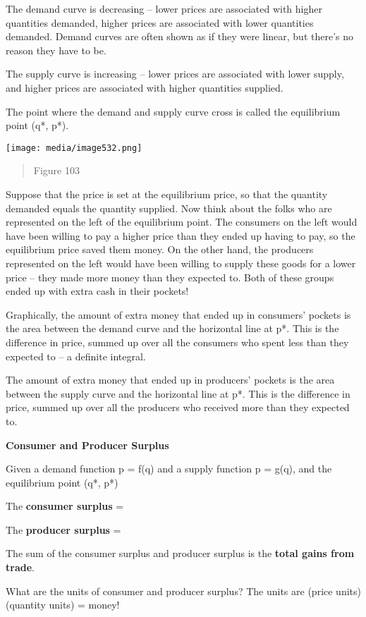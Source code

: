 The demand curve is decreasing -- lower prices are associated with
higher quantities demanded, higher prices are associated with lower
quantities demanded. Demand curves are often shown as if they were
linear, but there's no reason they have to be.

The supply curve is increasing -- lower prices are associated with lower
supply, and higher prices are associated with higher quantities
supplied.

The point where the demand and supply curve cross is called the
equilibrium point (q*, p*).

\texttt{[image: media/image532.png]}

\begin{quote}
Figure 103
\end{quote}

Suppose that the price is set at the equilibrium price, so that the
quantity demanded equals the quantity supplied. Now think about the
folks who are represented on the left of the equilibrium point. The
consumers on the left would have been willing to pay a higher price than
they ended up having to pay, so the equilibrium price saved them money.
On the other hand, the producers represented on the left would have been
willing to supply these goods for a lower price -- they made more money
than they expected to. Both of these groups ended up with extra cash in
their pockets!

Graphically, the amount of extra money that ended up in consumers'
pockets is the area between the demand curve and the horizontal line at
p*. This is the difference in price, summed up over all the consumers
who spent less than they expected to -- a definite integral.

The amount of extra money that ended up in producers' pockets is the
area between the supply curve and the horizontal line at p*. This is the
difference in price, summed up over all the producers who received more
than they expected to.

\textbf{Consumer and Producer Surplus}

Given a demand function p = f(q) and a supply function p = g(q), and the
equilibrium point (q*, p*)

The \textbf{consumer surplus} =

The \textbf{producer surplus} =

The sum of the consumer surplus and producer surplus is the
\textbf{total gains from trade}.

What are the units of consumer and producer surplus? The units are
(price units)(quantity units) = money!

